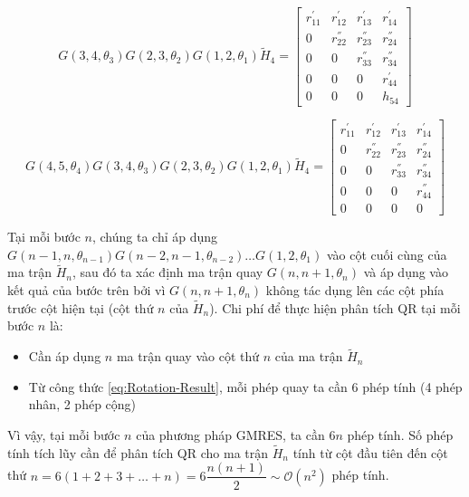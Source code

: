 \documentclass[14pt, a4paper]{article}
\numberwithin{equation}{section}
\numberwithin{algorithm}{section}
\numberwithin{figure}{section}
\numberwithin{dl}{section}
\numberwithin{md}{section}
\numberwithin{bd}{section}
\numberwithin{dn}{section}
\numberwithin{hq}{section}
\begin{document}
\begin{equation}
    G(3, 4, \theta_3)G(2, 3, \theta_2)G(1, 2, \theta_1) \widetilde{H}_4 = \begin{bmatrix} r_{11}^{'} & r_{12}^{'} & r_{13}^{'} & r_{14}^{'} \\
        0 & r_{22}^{''} & r_{23}^{''} & r_{24}^{''} \\
        0 & 0 & r_{33}^{''} & r_{34}^{''} \\
        0 & 0 & 0 & r_{44}^{'} \\
        0 & 0 & 0 & h_{54}  \end{bmatrix}
\end{equation}

\begin{equation}
    G(4, 5, \theta_4)G(3, 4, \theta_3)G(2, 3, \theta_2)G(1, 2, \theta_1) \widetilde{H}_4 = \begin{bmatrix} r_{11}^{'} & r_{12}^{'} & r_{13}^{'} & r_{14}^{'} \\
        0 & r_{22}^{''} & r_{23}^{''} & r_{24}^{''} \\
        0 & 0 & r_{33}^{''} & r_{34}^{''} \\
        0 & 0 & 0 & r_{44}^{''} \\
        0 & 0 & 0 & 0  \end{bmatrix}
\end{equation}

Tại mỗi bước $n$, chúng ta chỉ áp dụng $G(n-1, n, \theta_{n-1})G(n-2, n-1, \theta_{n-2})\dots G(1, 2, \theta_1)$ vào cột cuối cùng của ma trận $\widetilde{H}_n$, sau đó ta xác định ma trận quay $G(n, n+1, \theta_{n})$ và áp dụng vào kết quả của bước trên bởi vì $G(n, n+1, \theta_{n})$ không tác dụng lên các cột phía trước cột hiện tại (cột thứ $n$ của $\widetilde{H}_n$). Chi phí để thực hiện phân tích QR tại mỗi bước $n$ là:

\begin{itemize}
    \item Cần áp dụng $n$ ma trận quay vào cột thứ $n$ của ma trận $\widetilde{H}_n$
    \item Từ công thức \ref{eq:Rotation-Result}, mỗi phép quay ta cần 6 phép tính (4 phép nhân, 2 phép cộng)
\end{itemize}

Vì vậy, tại mỗi bước $n$ của phương pháp GMRES, ta cần $6n$ phép tính. Số phép tính tích lũy cần để phân tích QR cho ma trận $\widetilde{H}_n$ tính từ cột đầu tiên đến cột thứ $n=6(1+2+3+\dots+n)=6\dfrac{n(n+1)}{2}\sim \mathcal{O}(n^2)$
phép tính.
\end{document}
